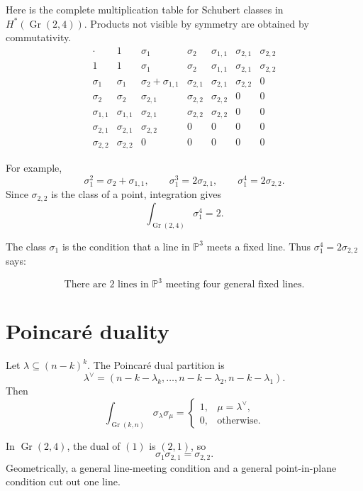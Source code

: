 Here is the complete multiplication table for Schubert classes in
$H^*(\operatorname{Gr}(2,4))$.  Products not visible by symmetry are obtained
by commutativity.
\[
\begin{array}{c|cccccc}
\cdot
& 1 & \sigma_1 & \sigma_2 & \sigma_{1,1} & \sigma_{2,1} & \sigma_{2,2}\\
\hline
1
& 1 & \sigma_1 & \sigma_2 & \sigma_{1,1} & \sigma_{2,1} & \sigma_{2,2}\\
\sigma_1
& \sigma_1 & \sigma_2+\sigma_{1,1} & \sigma_{2,1} & \sigma_{2,1} & \sigma_{2,2} & 0\\
\sigma_2
& \sigma_2 & \sigma_{2,1} & \sigma_{2,2} & \sigma_{2,2} & 0 & 0\\
\sigma_{1,1}
& \sigma_{1,1} & \sigma_{2,1} & \sigma_{2,2} & \sigma_{2,2} & 0 & 0\\
\sigma_{2,1}
& \sigma_{2,1} & \sigma_{2,2} & 0 & 0 & 0 & 0\\
\sigma_{2,2}
& \sigma_{2,2} & 0 & 0 & 0 & 0 & 0
\end{array}
\]

For example,
\[
  \sigma_1^2=\sigma_2+\sigma_{1,1},
  \qquad
  \sigma_1^3=2\sigma_{2,1},
  \qquad
  \sigma_1^4=2\sigma_{2,2}.
\]
Since $\sigma_{2,2}$ is the class of a point, integration gives
\[
  \int_{\operatorname{Gr}(2,4)}\sigma_1^4=2.
\]

\begin{example*}
The class $\sigma_1$ is the condition that a line in $\mathbb{P}^3$ meets a
fixed line.  Thus $\sigma_1^4=2\sigma_{2,2}$ says:

\[
  \text{There are }2\text{ lines in }\mathbb{P}^3
  \text{ meeting four general fixed lines.}
\]
\end{example*}


\section[schubertCalculusPoincareDuality]{Poincaré duality}

Let $\lambda\subseteq(n-k)^k$.  The Poincaré dual partition is
\[
  \lambda^\vee
  =
  (n-k-\lambda_k,\dotsc,n-k-\lambda_2,n-k-\lambda_1).
\]
Then
\[
  \int_{\operatorname{Gr}(k,n)}
  \sigma_\lambda\sigma_\mu
  =
  \begin{cases}
  1, & \mu=\lambda^\vee,\\
  0, & \text{otherwise.}
  \end{cases}
\]

\begin{example*}
In $\operatorname{Gr}(2,4)$, the dual of $(1)$ is $(2,1)$, so
\[
  \sigma_1\sigma_{2,1}=\sigma_{2,2}.
\]
Geometrically, a general line-meeting condition and a general
point-in-plane condition cut out one line.
\end{example*}



